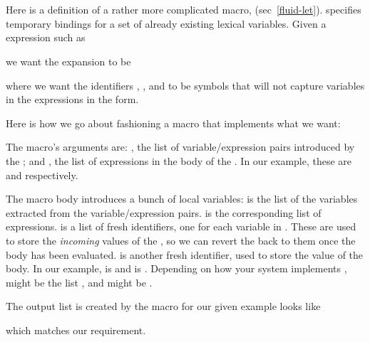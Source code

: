 
\section{}
\label{fluid-let-macro}

Here is a definition of a rather more complicated
macro,  (sec~\ref{fluid-let}).
 specifies temporary bindings for
a set of already existing lexical variables.  Given a
 expression such as


\n we want the expansion to be


\n where we want the identifiers , ,
  and  to be symbols that will not capture
variables in the expressions in the  form.

Here is how we go about fashioning a 
macro that implements what we want:


\n The macro's arguments are:
, the list of
variable/expression pairs introduced by the ; and  
, the list of
expressions in the body of the .  In our
example, these are  and  respectively.

The macro body introduces a bunch of local variables:
 is the list of the variables extracted from the
variable/expression pairs. 
 is the corresponding list of
expressions.  is a list of fresh identifiers,
one for each variable in .  These are used to
store the {\em incoming} values of the , so we
can revert the  back to them once the
 body has been evaluated.
 is another
fresh identifier, used to store the value of the
 body.  In our example,  is 
and  is .  Depending on how your
system implements ,
 might be the
list , and  might be .

The output list is created by the macro for our given
example looks like


\n 
which matches our requirement.

